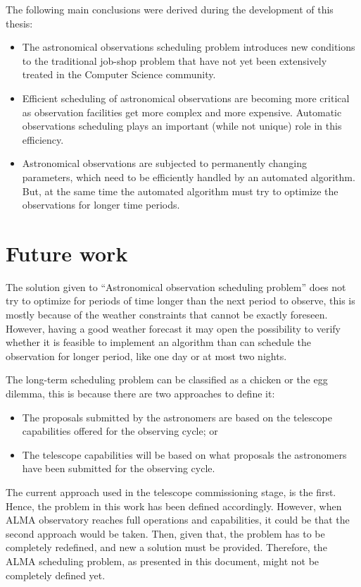 The following main conclusions were derived during the development of this thesis:
\begin{itemize}
\item The astronomical observations scheduling problem introduces new conditions to the traditional 
job-shop problem that have not yet been extensively treated in the Computer Science community.

\item Efficient scheduling of astronomical observations are becoming more critical as observation
facilities get more complex and more expensive. Automatic observations scheduling plays an
important (while not unique) role in this efficiency.

\item Astronomical observations are subjected to permanently changing parameters, which need to
be efficiently handled by an automated algorithm. But, at the same time the automated algorithm must try to optimize the observations for longer time periods. 
\end{itemize}

\section{Future work}
The solution given to ``Astronomical observation scheduling problem'' does not try to optimize for periods of time longer than the next period to observe, this is mostly because of the weather constraints that cannot be exactly foreseen. However, having a good weather forecast it may open the possibility to verify whether it is feasible to implement an algorithm than can schedule the observation for longer period, like one day or at most two nights.

The long-term scheduling problem can be classified as a chicken or the egg dilemma, this is because there are two approaches to define it:
\begin{itemize}
\item The proposals submitted by the astronomers are based on the telescope capabilities offered for the observing cycle; or
\item The telescope capabilities will be based on what proposals the astronomers have been submitted for the observing cycle.
\end{itemize}

The current approach used in the telescope commissioning stage, is the first. Hence, the problem in this work has been defined accordingly. However, when ALMA observatory reaches full operations and capabilities, it could be that the second approach would be taken. Then, given that, the problem has to be completely redefined, and new a solution must be provided. Therefore, the ALMA scheduling problem, as presented in this document, might not be completely defined yet.


